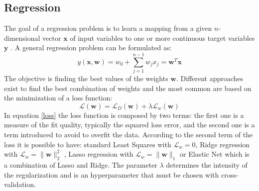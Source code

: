 \documentclass[]{article}
\begin{document}
\subsection{Regression}
The goal of a regression problem is to learn a mapping from a given $n$-dimensional vector $\textbf{x}$ of input variables to one or more continuous target variables $\textbf{y}$ \cite{bishop2006}. A general regression problem can be formulated as:
\begin{equation}\label{regression}
y(\textbf{x}, \textbf{w}) = w_0 + \sum_{j=1}^{n-1}w_j x_j = \textbf{w}^T\textbf{x}
\end{equation}
The objective is finding the best values of the weights $\textbf{w}$. Different approaches exist to find the best combination of weights and the most common are based on the minimization of a loss function:
\begin{equation}\label{loss}
\mathcal{L}(\textbf{w})  = \mathcal{L}_D(\textbf{w}) + \lambda \mathcal{L}_w(\textbf{w})
\end{equation}
In equation \eqref{loss} the loss function is composed by two terms: the first one is a measure of the fit quality, typically the squared loss error, and the second one is a term introduced to avoid to overfit the data. According to the second term of the loss it is possible to have: standard Least Squares with $\mathcal{L}_w = 0$, Ridge regression with $\mathcal{L}_w = \parallel \textbf{w} \parallel_2^2$ , Lasso regression with $\mathcal{L}_w =\parallel \textbf{w} \parallel_1$ or Elastic Net which is a combination of Lasso and Ridge. The parameter $\lambda$ determines the intensity of the regularization and is an  hyperparameter that must be chosen with cross-validation.
\end{document}
